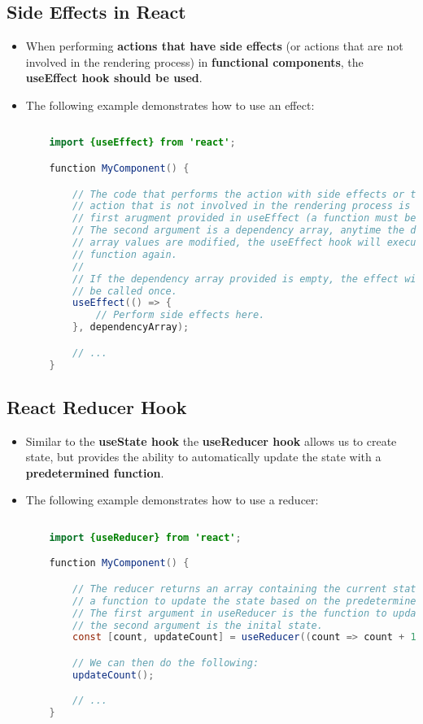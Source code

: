 \documentclass{article}
\begin{document}
    \subsection*{Side Effects in React}
    \begin{itemize}
        \item When performing \textbf{actions that have side effects} (or actions that are not involved in the rendering process) in \textbf{functional components}, the \textbf{useEffect hook should be used}.
        \item The following example demonstrates how to use an effect:
        \begin{lstlisting}[language=Java]
    
    import {useEffect} from 'react';

    function MyComponent() {

        // The code that performs the action with side effects or the
        // action that is not involved in the rendering process is the
        // first arugment provided in useEffect (a function must be passed).
        // The second argument is a dependency array, anytime the dependency
        // array values are modified, the useEffect hook will execute the
        // function again.
        //
        // If the dependency array provided is empty, the effect will only 
        // be called once.
        useEffect(() => {
            // Perform side effects here.
        }, dependencyArray);

        // ...
    }
        \end{lstlisting}
    \end{itemize}

    \subsection*{React Reducer Hook}
    \begin{itemize}
        \item Similar to the \textbf{useState hook} the \textbf{useReducer hook} allows us to create state, but provides the ability to automatically update the state with a \textbf{predetermined function}.
        \item The following example demonstrates how to use a reducer:
        \begin{lstlisting}[language=Java]
            
    import {useReducer} from 'react';

    function MyComponent() {

        // The reducer returns an array containing the current state, and
        // a function to update the state based on the predetermined function.
        // The first argument in useReducer is the function to update the state,
        // the second argument is the inital state.
        const [count, updateCount] = useReducer((count => count + 1), 0);

        // We can then do the following:
        updateCount();

        // ...
    }
        \end{lstlisting}
    \end{itemize}
\end{document}
